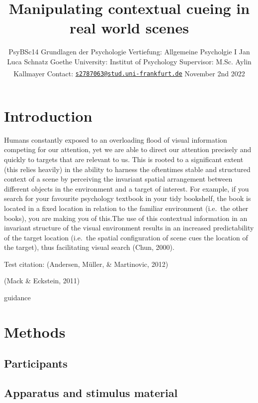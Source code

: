 \documentclass[
  man,floatsintext]{apa7}
\title{Manipulating contextual cueing in real world scenes}
\author{PsyBSc14 Grundlagen der Psychologie Vertiefung: Allgemeine Psycholgie I \break Jan Luca Schnatz \break Goethe University: Institut of Psychology \break Supervisor: M.Sc. Aylin Kallmayer \break Contact: \href{mailto:s2787063@stud.uni-frankfurt.de}{\nolinkurl{s2787063@stud.uni-frankfurt.de}} \break November 2nd 2022\textsuperscript{}}
\date{}
\affiliation{\phantom{0}}
\begin{document}
\maketitle

\hypertarget{introduction}{%
\section{Introduction}\label{introduction}}

Humans constantly exposed to an overloading flood of visual information competing for our attention, yet we are able to direct our attention precisely and quickly to targets that are relevant to us. This is rooted to a significant extent (this relies heavily) in the ability to harness the oftentimes stable and structured context of a scene by perceiving the invariant spatial arrangement between different objects in the environment and a target of interest. For example, if you search for your favourite psychology textbook in your tidy bookshelf, the book is located in a fixed location in relation to the familiar environment (i.e.~the other books), you are making you of this.The use of this contextual information in an invariant structure of the visual environment results in an increased predictability of the target location (i.e.~the spatial configuration of scene cues the location of the target), thus facilitating visual search (Chun, 2000).

Test citation: (Andersen, Müller, \& Martinovic, 2012)

(Mack \& Eckstein, 2011)

guidance
\newpage

\hypertarget{methods}{%
\section{Methods}\label{methods}}

\hypertarget{participants}{%
\subsection{Participants}\label{participants}}

\hypertarget{apparatus-and-stimulus-material}{%
\subsection{Apparatus and stimulus material}\label{apparatus-and-stimulus-material}}
\end{document}
